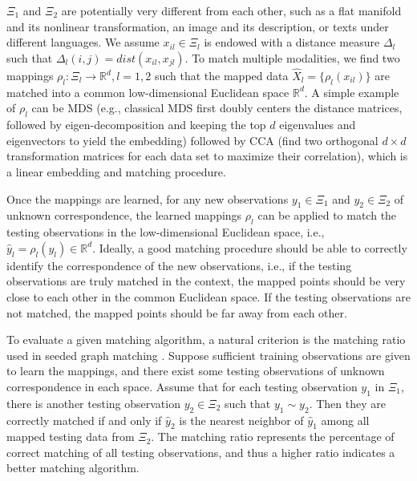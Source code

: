 \documentclass[times,twocolumn,final]{elsarticle}
\begin{document}
$\Xi_{1}$ and $\Xi_{2}$ are potentially very different from each other, such as a flat manifold and its nonlinear transformation, an image and its description, or texts under different languages. We assume $x_{il} \in \Xi_{l}$ is endowed with a distance measure $\Delta_{l}$ such that $\Delta_{l}(i,j)=dist(x_{il},x_{jl})$. To match multiple modalities, we find two mappings $\rho_{l}: \Xi_{l} \rightarrow \mathbb{R}^{d}, l=1,2$ such that the mapped data $\hat{X}_{l}=\{ \rho_{l}(x_{il}) \}$ are matched into a common low-dimensional Euclidean space $\mathbb{R}^{d}$. A simple example of $\rho_{l}$ can be MDS (e.g., classical MDS first doubly centers the distance matrices, followed by eigen-decomposition and keeping the top $d$ eigenvalues and eigenvectors to yield the embedding) followed by CCA (find two orthogonal $d \times d$ transformation matrices for each data set to maximize their correlation), which is a linear embedding and matching procedure.

Once the mappings are learned, for any new observations $y_{1} \in \Xi_{1}$ and $y_{2} \in \Xi_{2}$ of unknown correspondence, the learned mappings $\rho_{l}$ can be applied to match the testing observations in the low-dimensional Euclidean space, i.e., $\hat{y}_{l} = \rho_{l}(y_{l}) \in \mathbb{R}^{d}$. Ideally, a good matching procedure should be able to correctly identify the correspondence of the new observations, i.e., if the testing observations are truly matched in the context, the mapped points should be very close to each other in the common Euclidean space. If the testing observations are not matched, the mapped points should be far away from each other.

To evaluate a given matching algorithm, a natural criterion is the matching ratio used in seeded graph matching \citep{LyzinskiFishkindPriebe2014}. Suppose sufficient training observations are given to learn the mappings, and there exist some testing observations of unknown correspondence in each space. Assume that for each testing observation $y_{1}$ in $\Xi_{1}$, there is another testing observation $y_{2} \in \Xi_{2}$ such that $y_{1} \sim y_{2}$. Then they are correctly matched if and only if $\hat{y}_{2}$ is the nearest neighbor of $\hat{y}_{1}$ among all mapped testing data from $\Xi_{2}$. The matching ratio represents the percentage of correct matching of all testing observations, and thus a higher ratio indicates a better matching algorithm. 
\end{document}

